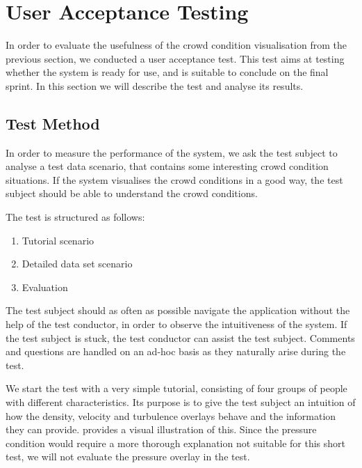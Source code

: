 \section{User Acceptance Testing} \label{sec:s4_test}

In order to evaluate the usefulness of the crowd condition visualisation from the previous section, we conducted a user acceptance test. This test aims at testing whether the system is ready for use, and is suitable to conclude on the final sprint. In this section we will describe the test and analyse its results.

\subsection{Test Method}

In order to measure the performance of the system, we ask the test subject to analyse a test data scenario, that contains some interesting crowd condition situations. If the system visualises the crowd conditions in a good way, the test subject should be able to understand the crowd conditions.

The test is structured as follows:

\begin{enumerate}
    \item Tutorial scenario
    \item Detailed data set scenario
    \item Evaluation
\end{enumerate}

The test subject should as often as possible navigate the application without the help of the test conductor, in order to observe the intuitiveness of the system. If the test subject is stuck, the test conductor can assist the test subject. Comments and questions are handled on an ad-hoc basis as they naturally arise during the test.

We start the test with a very simple tutorial, consisting of four groups of people with different characteristics. Its purpose is to give the test subject an intuition of how the density, velocity and turbulence overlays behave and the information they can provide.  provides a visual illustration of this. Since the pressure condition would require a more thorough explanation not suitable for this short test, we will not evaluate the pressure overlay in the test.

